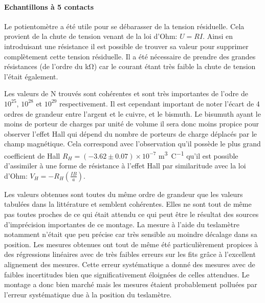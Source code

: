 \paragraph*{Echantillons à 5 contacts}
Le potientomètre a été utile pour se débarasser de la tension résiduelle. Cela provient de la chute de tension venant de la loi d'Ohm: \(U = R I\). Ainsi en introduisant une résistance il est possible de trouver sa valeur pour supprimer complètement cette tension résiduelle. Il a été nécessaire de prendre des grandes résistances (de l'ordre du \si{\kilo \ohm}) car le courant étant très faible la chute de tension l'était également.

Les valeurs de N trouvés sont cohérentes et sont très importantes de l'odre de \(10^{25}\), \(10^{28}\) et \(10^{29}\) respectivement. Il est cependant important de noter l'écart de 4 ordres de grandeur entre l'argent et le cuivre, et le bismuth. Le bisumuth ayant le moins de porteur de charges par unité de volume il sera donc moins propice pour observer l'effet Hall qui dépend du nombre de porteurs de charge déplacés par le champ magnétique. Cela correspond avec l'observation qu'il possède le plus grand coefficient de Hall \(R_H = (-3.62 \pm 0.07) \times 10^{-7}\) \si{\cubic \meter \per \coulomb} qu'il est possible d'assimiler à une forme de résistance à l'effet Hall par similaritude avec la loi d'Ohm: \(V_H = -R_H (\frac{IB}{a})\).

Les valeurs obtenues sont toutes du même ordre de grandeur que les valeurs tabulées dans la littérature \cite{notice} et semblent cohérentes. Elles ne sont tout de même pas toutes proches de ce qui était attendu ce qui peut être le résultat des sources d'imprécision importantes de ce montage. La mesure à l'aide du teslamètre notamment n'était que peu précise car très sensible au moindre décalage dans sa position. Les mesures obtenues ont tout de même été particulièrement propices à des régressions linéaires avec de très faibles erreurs sur les fits grâce à l'excellent alignement des mesures. Cette erreur systématique a donné des mesures avec de faibles incertitudes bien que significativement éloignées de celles attendues. Le montage a donc bien marché mais les mesures étaient probablement polluées par l'erreur systématique due à la position du teslamètre.